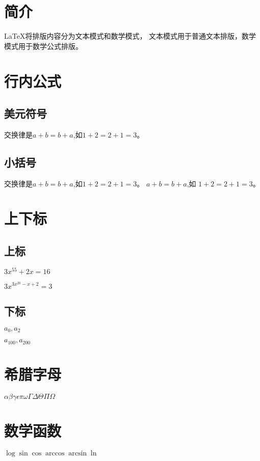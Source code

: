 \documentclass{article}
\begin{document}
    \section{简介}
    \LaTeX{}将排版内容分为文本模式和数学模式，
    文本模式用于普通文本排版，数学模式用于数学公式排版。
    
    \section{行内公式}
    \subsection{美元符号}
    交换律是$a+b=b+a$,如$1+2=2+1=3$。
    \subsection{小括号}
    交换律是\(a+b=b+a\),如\(1+2=2+1=3\)。
    \begin{math}
        a+b=b+a
    \end{math},如
    \begin{math}
        1+2=2+1=3
    \end{math}。
    
    \section{上下标}
    \subsection{上标}
    $3x^{55}+2x=16$

    $3x^{3x^{20}-x+2}=3$
    \subsection{下标}
    $a_0,a_2$

    $a_{100},a_{200}$
    \section{希腊字母}
    \begin{math}
        \alpha
        \beta
        \gamma
        \epsilon
        \pi
        \omega
        \Gamma
        \Delta
        \Theta
        \Pi
        \Omega
    \end{math}

    \section{数学函数}
    \begin{math}
        \log
        \sin
        \cos
        \arccos
        \arcsin
        \ln
    \end{math}
\end{document}
